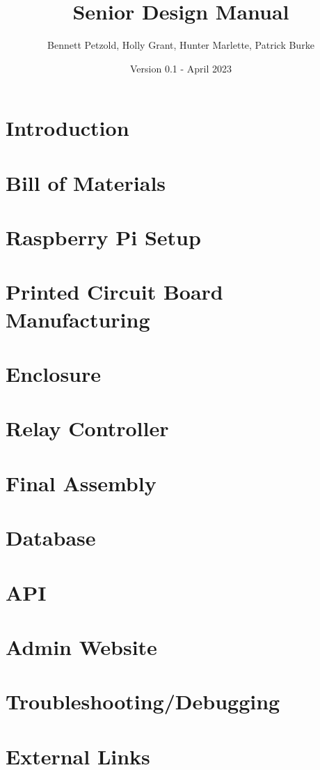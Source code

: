\documentclass[12pt, letterpaper]{article}
\title{Senior Design Manual}
\author{Bennett Petzold, Holly Grant, Hunter Marlette, Patrick Burke}
\date{Version 0.1 - April 2023}
\begin{document}
\maketitle


\tableofcontents{}
\pagebreak{}

\section{Introduction}


\section{Bill of Materials}


\section{Raspberry Pi Setup}


\section{Printed Circuit Board Manufacturing}


\section{Enclosure}


\section{Relay Controller}
\label{sec: relay-controller}


\pagebreak{}
\section{Final Assembly}
\label{sec: final-assembly}


\pagebreak{}
\section{Database}


\section{API}


\section{Admin Website}


\section{Troubleshooting/Debugging}


\section{External Links}

\end{document}
